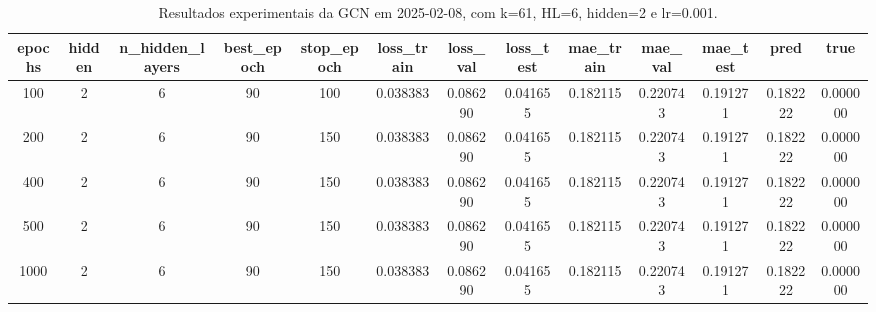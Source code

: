 \begin{table}[h]
\centering
\caption{Resultados experimentais da GCN em 2025-02-08, com k=61, HL=6, hidden=2 e lr=0.001.}
\label{tab:gcn_results_k61_hl6_h2_d20250208}
\begin{tabular}{ccccccccccccc}
\toprule
epochs & hidden & n\_hidden\_layers & best\_epoch & stop\_epoch & loss\_train & loss\_val & loss\_test & mae\_train & mae\_val & mae\_test & pred & true \\
\midrule
100 & 2 & 6 & 90 & 100 & 0.038383 & 0.086290 & 0.041655 & 0.182115 & 0.220743 & 0.191271 & 0.182222 & 0.000000 \\
200 & 2 & 6 & 90 & 150 & 0.038383 & 0.086290 & 0.041655 & 0.182115 & 0.220743 & 0.191271 & 0.182222 & 0.000000 \\
400 & 2 & 6 & 90 & 150 & 0.038383 & 0.086290 & 0.041655 & 0.182115 & 0.220743 & 0.191271 & 0.182222 & 0.000000 \\
500 & 2 & 6 & 90 & 150 & 0.038383 & 0.086290 & 0.041655 & 0.182115 & 0.220743 & 0.191271 & 0.182222 & 0.000000 \\
1000 & 2 & 6 & 90 & 150 & 0.038383 & 0.086290 & 0.041655 & 0.182115 & 0.220743 & 0.191271 & 0.182222 & 0.000000 \\
\bottomrule
\end{tabular}
\end{table}
